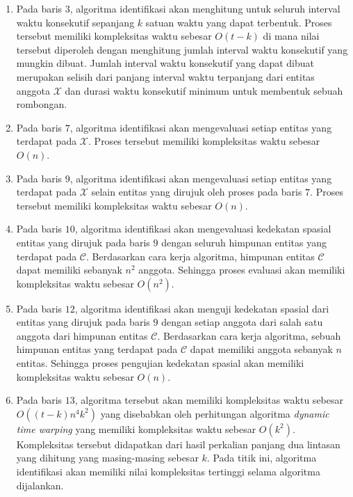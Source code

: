 \begin{enumerate}
    \item Pada baris $3$, algoritma identifikasi akan menghitung untuk seluruh interval waktu konsekutif sepanjang $k$ satuan waktu yang dapat terbentuk. Proses tersebut memiliki kompleksitas waktu sebesar $O(t - k)$ di mana nilai tersebut diperoleh dengan menghitung jumlah interval waktu konsekutif yang mungkin dibuat. Jumlah interval waktu konsekutif yang dapat dibuat merupakan selisih dari panjang interval waktu terpanjang dari entitas anggota $\mathcal{X}$ dan durasi waktu konsekutif minimum untuk membentuk sebuah rombongan.
    \item Pada baris $7$, algoritma identifikasi akan mengevaluasi setiap entitas yang terdapat pada $\mathcal{X}$. Proses tersebut memiliki kompleksitas waktu sebesar $O(n)$.
    \item Pada baris $9$, algoritma identifikasi akan mengevaluasi setiap entitas yang terdapat pada $\mathcal{X}$ selain entitas yang dirujuk oleh proses pada baris $7$. Proses tersebut memiliki kompleksitas waktu sebesar $O(n)$.
    \item Pada baris $10$, algoritma identifikasi akan mengevaluasi kedekatan spasial entitas yang dirujuk pada baris $9$ dengan seluruh himpunan entitas yang terdapat pada $\mathcal{C}$. Berdasarkan cara kerja algoritma, himpunan entitas $\mathcal{C}$ dapat memiliki sebanyak $n^2$ anggota. Sehingga proses evaluasi akan memiliki kompleksitas waktu sebesar $O(n^2)$.
    \item Pada baris $12$, algoritma identifikasi akan menguji kedekatan spasial dari entitas yang dirujuk pada baris $9$ dengan setiap anggota dari salah satu anggota dari himpunan entitas $\mathcal{C}$. Berdasarkan cara kerja algoritma, sebuah himpunan entitas yang terdapat pada $\mathcal{C}$ dapat memiliki anggota sebanyak $n$ entitas. Sehingga proses pengujian kedekatan spasial akan memiliki kompleksitas waktu sebesar $O(n)$.
    \item Pada baris $13$, algoritma tersebut akan memiliki kompleksitas waktu sebesar $O((t - k)n^4k^2)$ yang disebabkan oleh perhitungan algoritma \textit{dynamic time warping} yang memiliki kompleksitas waktu sebesar $O(k^2)$. Kompleksitas tersebut didapatkan dari hasil perkalian panjang dua lintasan yang dihitung yang masing-masing sebesar $k$. Pada titik ini, algoritma identifikasi akan memiliki nilai kompleksitas tertinggi selama algoritma dijalankan.
\end{enumerate}

